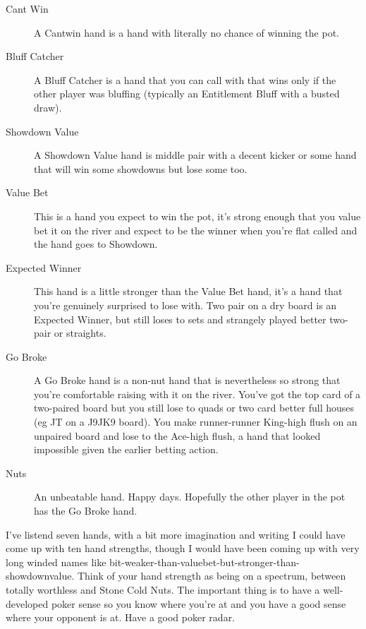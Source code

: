 \begin{description}

\item[Cant Win] A Cantwin hand is a hand with literally no chance of
winning the pot.

\item[Bluff Catcher] A Bluff Catcher is a hand that you can call with
that wins only if the other player was bluffing (typically an
Entitlement Bluff with a busted draw).

\item[Showdown Value] A Showdown Value hand is middle pair with a
decent kicker or some hand that will win some showdowns but lose some too.

\item[Value Bet] This is a hand you expect to win the pot, it's strong
enough that you value bet it on the river and expect to be the winner
when you're flat called and the hand goes to Showdown.

\item[Expected Winner] This hand is a little stronger than the Value
Bet hand, it's a hand that you're genuinely surprised to lose
with. Two pair on a dry board is an Expected Winner, but still loses
to sets and strangely played better two-pair or straights.

\item[Go Broke] A Go Broke hand is a non-nut hand that is nevertheless
so strong that you're comfortable raising with it on the river. You've
got the top card of a two-paired board but you still lose to quads or
two card better full houses (eg JT on a J9JK9 board). You make
runner-runner King-high flush on an unpaired board and lose to the
Ace-high flush, a hand that looked impossible given the earlier
betting action.

\item[Nuts] An unbeatable hand. Happy days. Hopefully the other player
in the pot has the Go Broke hand.

\end{description}


I've listend seven hands, with a bit more imagination and writing
I could have come up with ten hand strengths, though I would have been
coming up with very long winded names like
bit-weaker-than-valuebet-but-stronger-than-showdownvalue. Think of
your hand strength as being on a spectrum, between totally
worthless and Stone Cold Nuts. The important thing is to have
a well-developed poker sense so you know where you're at and you
have a good sense where your opponent is at. Have a good poker radar.

